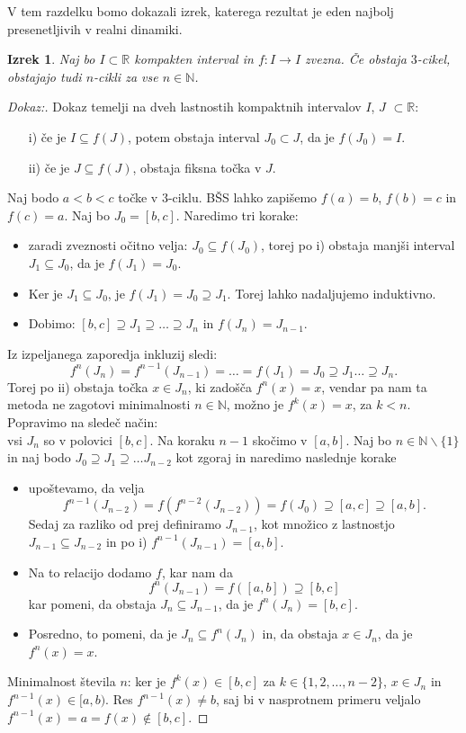 \documentclass{article}
\newtheorem{izrek}{Izrek}
\newcommand{\N}{\mathbb{N}}
\newcommand{\R}{\mathbb{R}}
\begin{document}
V tem razdelku bomo dokazali izrek, katerega rezultat je eden najbolj 
presenetljivih v realni dinamiki.
\begin{izrek}
Naj bo $I \subset \R$ kompakten interval in $f: I \rightarrow I$ zvezna. 
Če obstaja $3$-cikel, obstajajo tudi $n$-cikli za vse $n\in \N$.
\end{izrek}
\begin{proof}[Dokaz:]
Dokaz temelji na dveh lastnostih kompaktnih intervalov $I$, $J$ $\subset \R$:
\begin{enumerate}
    \item[i)] če je $I \subseteq f(J)$, potem obstaja interval $J_0 \subset J$, 
    da je $f(J_0) = I$.
    \item[ii)] če je $J \subseteq f(J)$, obstaja fiksna točka v $J$.
\end{enumerate}

Naj bodo $a < b < c$ točke v $3$-ciklu. BŠS lahko zapišemo $f(a) = b$,
$f(b) = c$ in $f(c) = a$. Naj bo $J_0 = [b, c]$. Naredimo tri korake:
\begin{itemize}
    \item zaradi zveznosti očitno velja: $J_0 \subseteq f(J_0)$, torej po 
    i) obstaja manjši interval $J_1 \subseteq J_0$, da je $f(J_1) = J_0$.
    \item Ker je $J_1 \subseteq J_0$, je $f(J_1) = J_0 \supseteq J_1$. 
    Torej lahko nadaljujemo induktivno.
    \item Dobimo: $[b, c] \supseteq J_1 \supseteq \dots \supseteq J_n$ in 
    $f(J_n) = J_{n-1}$.
\end{itemize}
Iz izpeljanega zaporedja inkluzij sledi: 
$$
f^n(J_n) = f^{n-1}(J_{n-1}) = \dots = f(J_1) = J_0 \supseteq J_1 \dots \supseteq J_n.
$$
Torej po ii) obstaja točka $x\in J_n$, ki zadošča $f^n(x) = x$, vendar pa 
nam ta metoda ne zagotovi minimalnosti $n\in \N$, možno je $f^k(x) = x$, 
za $k < n$. Popravimo na sledeč način:\\
vsi $J_n$ so v polovici $[b, c]$. Na koraku $n-1$ skočimo v $[a, b]$.
Naj bo $n\in \N\backslash \{1\}$ in naj bodo $J_0 \supseteq J_1 \supseteq \dots J_{n-2}$
kot zgoraj in naredimo naslednje korake
\begin{itemize}
    \item upoštevamo, da velja 
    $$
    f^{n-1}(J_{n-2}) = f(f^{n-2}(J_{n-2})) = f(J_0) \supseteq [a, c] \supseteq [a, b].
    $$
    Sedaj za razliko od prej definiramo $J_{n-1}$, kot množico z lastnostjo 
    $J_{n-1} \subseteq J_{n-2}$ in po i) $f^{n-1}(J_{n-1}) = [a, b]$.
    \item Na to relacijo dodamo $f$, kar nam da 
    $$
    f^n(J_{n-1}) = f([a, b]) \supseteq [b, c]
    $$
    kar pomeni, da obstaja $J_n \subseteq J_{n-1}$, da je $f^n(J_n) = [b, c]$.
    \item Posredno, to pomeni, da je $J_n \subseteq f^n(J_n)$ in, da obstaja $x\in J_n$, 
    da je $f^n(x) = x$.     
\end{itemize}
Minimalnost števila $n$: ker je $f^k(x) \in [b, c]$ za $k\in \{1, 2, \dots, n-2\}$, $x\in J_n$
in $f^{n-1}(x) \in [a, b)$. Res $f^{n-1}(x) \neq b$, saj bi v nasprotnem 
primeru veljalo $f^{n-1}(x) = a = f(x) \not\in [b, c]$. 


\end{proof}
\end{document}
